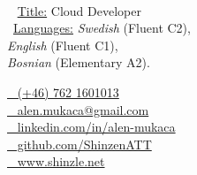 \begin{minipage}[t]{0.4\textwidth}
    \vspace{0pt} %
    {\par\centering\huge{}} \\[0.3cm]

    {\small
    \faGraduationCap~ \underline{Title:} Cloud Developer \\
    \faCommentsO~\underline{Languages:} \emph{Swedish} (Fluent C2), \\ \emph{English} (Fluent C1), \\ \emph{Bosnian} (Elementary A2).}
\end{minipage}\hfill
\begin{minipage}[t]{0.55\textwidth}
    \vspace{0pt} %
    \href{tel:+46762160103}{\faPhone~ (+46) 762 1601013} \\
    \href{mailto:alen.mukaca@gmail.com}{\faEnvelopeO~ \protect alen.mukaca@gmail.com} \\[0.1cm]

    \href{https://linkedin.com/in/alen-mukaca/}{\faLinkedin~ \protect linkedin.com/in/alen-mukaca} \\
    \href{https://github.com/ShinzenATT}{\faGithub~ \protect github.com/ShinzenATT} \\
    \href{https://shinzle.net}{\faGlobe~ \protect www.shinzle.net}
\end{minipage}
